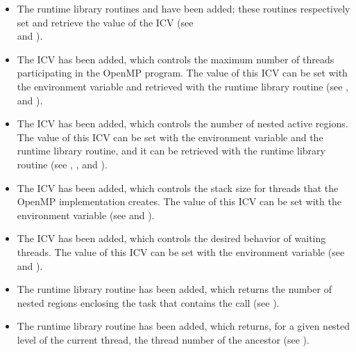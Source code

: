 \begin{itemize}
\item The runtime library routines  and 
have been added; these routines respectively set and retrieve the value of the
 ICV (see\\
 and
).

\item The  ICV has been added, which controls the maximum number of
threads participating in the OpenMP program. The value of this ICV can be set with
the  environment variable and retrieved with the
 runtime library routine (see
,
 and
).

\item The  ICV has been added, which controls the number of nested
active  regions. The value of this ICV can be set with the
 environment variable and the
 runtime library routine, and it can be retrieved
with the  runtime library routine (see
,
,
 and
).

\item The  ICV has been added, which controls the stack size for threads that
the OpenMP implementation creates. The value of this ICV can be set with the
 environment variable (see
 and
).

\item The  ICV has been added, which controls the desired behavior of
waiting threads. The value of this ICV can be set with the 
environment variable (see
 and
).

\item The  runtime library routine has been added, which returns the
number of nested  regions enclosing the task that contains the call (see
).

\item The  runtime library routine has been added,
which returns, for a given nested level of the current thread, the thread number of the
ancestor (see
).


\end{itemize}
